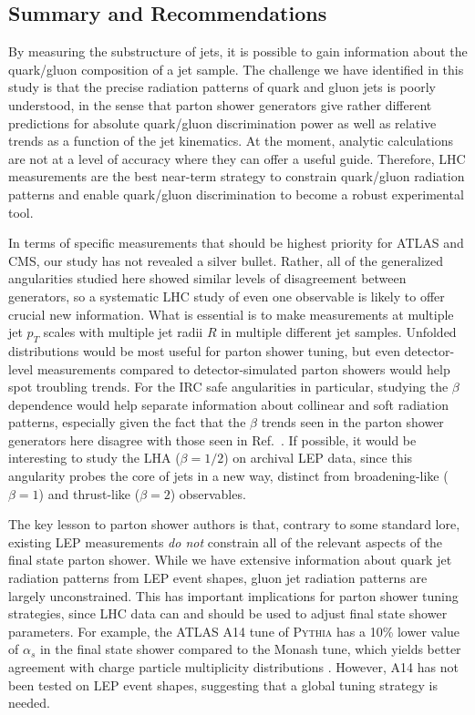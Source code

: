 \documentclass[11pt]{cernrep}
\begin{document}
\subsection{Summary and Recommendations}
\label{quarkgluon_sec:conclude}

By measuring the substructure of jets, it is possible to gain information about the quark/gluon composition of a jet sample.  The challenge we have identified in this study is that the precise radiation patterns of quark and gluon jets is poorly understood, in the sense that parton shower generators give rather different predictions for absolute quark/gluon discrimination power as well as relative trends as a function of the jet kinematics.  At the moment, analytic calculations are not at a level of accuracy where they can offer a useful guide.  Therefore, LHC measurements are the best near-term strategy to constrain quark/gluon radiation patterns and enable quark/gluon discrimination to become a robust experimental tool.

In terms of specific measurements that should be highest priority for ATLAS and CMS, our study has not revealed a silver bullet.  Rather, all of the generalized angularities studied here showed similar levels of disagreement between generators, so a systematic LHC study of even one observable is likely to offer crucial new information.  What is essential is to make measurements at multiple jet $p_T$ scales with multiple jet radii $R$ in multiple different jet samples.  Unfolded distributions would be most useful for parton shower tuning, but even detector-level measurements compared to detector-simulated parton showers would help spot troubling trends.  For the IRC safe angularities in particular, studying the $\beta$ dependence would help separate information about collinear and soft radiation patterns, especially given the fact that the $\beta$ trends seen in the parton shower generators here disagree with those seen in Ref.~\cite{Aad:2014gea}.  If possible, it would be interesting to study the LHA ($\beta = 1/2$) on archival LEP data, since this angularity probes the core of jets in a new way, distinct from broadening-like ($\beta = 1$) and thrust-like ($\beta = 2$) observables. 

The key lesson to parton shower authors is that, contrary to some standard lore, existing LEP measurements \emph{do not} constrain all of the relevant aspects of the final state parton shower.  While we have extensive information about quark jet radiation patterns from LEP event shapes, gluon jet radiation patterns are largely unconstrained.  This has important implications for parton shower tuning strategies, since LHC data can and should be used to adjust final state shower parameters.  For example, the ATLAS A14 tune of \textsc{Pythia} has a 10\% lower value of $\alpha_s$ in the final state shower compared to the Monash tune, which yields better agreement with charge particle multiplicity distributions \cite{Aad:2016oit}.  However, A14 has not been tested on LEP event shapes, suggesting that a global tuning strategy is needed. 
\end{document}
